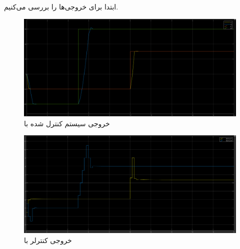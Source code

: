 \documentclass[14pt, a4paper]{extarticle}
\begin{document}
\subsubsection{}
ابتدا برای 
خروجی‌ها را بررسی می‌کنیم.\\
\begin{figure}[h!]
	\centering
	\includegraphics[scale = 0.3]{Q2_sim_result_st02.png}
	\caption{خروجی سیستم کنترل شده با
	}
\end{figure}
\begin{figure}[h!]
	\centering
	\includegraphics[scale = 0.3]{Q2_sim_control_st02.png}
	\caption{خروجی کنترلر با
	}
\end{figure}
\end{document}

